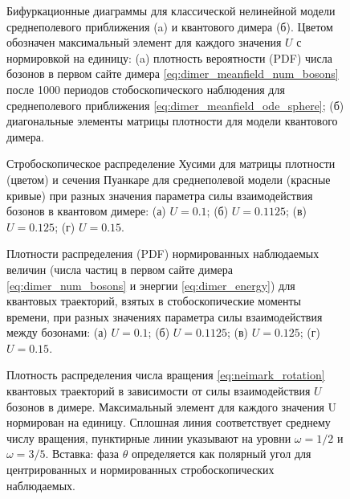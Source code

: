 \begin{figure}[ht]
	\caption[Бифуркационные диаграммы для классической нелинейной модели (среднеполевое приближение) и квантового димера]{
		Бифуркационные диаграммы для классической нелинейной модели среднеполевого приближения (a) и квантового димера (б). Цветом обозначен максимальный элемент для каждого значения \(U\) с нормировкой на единицу: (a) плотность вероятности (PDF) числа бозонов в первом сайте димера \cref{eq:dimer_meanfield_num_bosons} после 1000 периодов стобоскопического наблюдения для среднеполевого приближения \cref{eq:dimer_meanfield_ode_sphere}; (б) диагональные элементы матрицы плотности для модели квантового димера.
	}
	\label{fig:neimark_1}
\end{figure}

\begin{figure}[ht]
	\caption[Стробоскопическое распределение Хусими для матрицы плотности и сечения Пуанкаре для среднеполевой модели при разных значения параметра силы взаимодействия бозонов в квантовом димере]{
		Стробоскопическое распределение Хусими  для матрицы плотности (цветом) и сечения Пуанкаре  для среднеполевой модели (красные кривые) при разных значения параметра силы взаимодействия бозонов в квантовом димере: (а) \(U=0.1\); (б) \(U=0.1125\); (в) \(U=0.125\); (г) \(U=0.15\).
	}
	\label{fig:neimark_2}
\end{figure}

\begin{figure}[ht]
	\caption[Плотности распределения нормированных наблюдаемых величин для квантовых траекторий, взятых в стробоскопические моменты времени, при разных значениях параметра силы взаимодействия между бозонами]{
		Плотности распределения (PDF) нормированных наблюдаемых величин (числа частиц в первом сайте димера \cref{eq:dimer_num_bosons} и энергии \cref{eq:dimer_energy}) для квантовых траекторий, взятых в стобоскопические моменты времени, при разных значениях параметра силы взаимодействия между бозонами: (а) \(U=0.1\); (б) \(U=0.1125\); (в) \(U=0.125\); (г) \(U=0.15\).
	}
	\label{fig:neimark_3}
\end{figure}

\begin{figure}[ht]
	\caption[Плотность распределения числа вращения квантовых траекторий в зависимости от силы взаимодействия бозонов в димере]{
		Плотность распределения числа вращения \cref{eq:neimark_rotation} квантовых траекторий в зависимости от силы взаимодействия \(U\) бозонов в димере. 
		Максимальный элемент для каждого значения U нормирован на единицу. Сплошная линия соответствует среднему числу вращения, пунктирные линии указывают на уровни \(\omega=1/2\) и \(\omega=3/5\). 
		Вставка: фаза $\theta$ определяется как полярный угол для центрированных и нормированных стробоскопических наблюдаемых.
	}
	\label{fig:neimark_4}
\end{figure}

